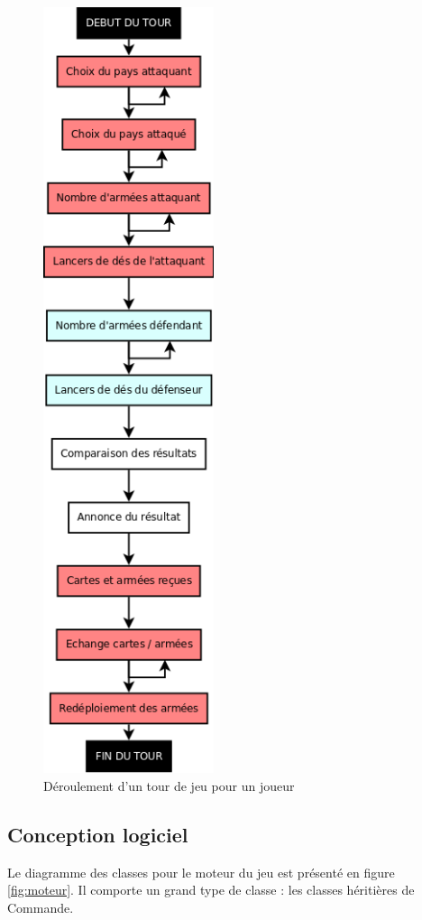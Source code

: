 \begin{figure}[!htbp]
    \centering
    \includegraphics[width=5cm]{Images/tour_jeu.png}
    \caption{Déroulement d'un tour de jeu pour un joueur}
    \label{fig:tour de jeu}
\end{figure}


\newpage
\subsection{Conception logiciel}
Le diagramme des classes pour le moteur du jeu est présenté en figure \ref{fig:moteur}. Il comporte un grand type de classe : les classes héritières de Commande.


